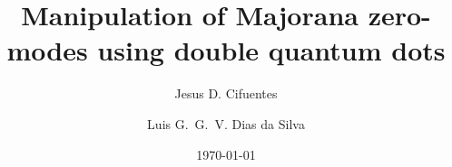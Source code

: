 \documentclass[showpacs,aps,prb,reprint,superscriptaddress]{revtex4-2}
\begin{document}
\newcommand{\be}   {\begin{equation}}
\newcommand{\ee}   {\end{equation}}
\newcommand{\ba}   {\begin{eqnarray}}
\newcommand{\ea}   {\end{eqnarray}}
\newcommand{\ve}  {\varepsilon}

\newcommand{\nhat}{\hat{n}}
\newcommand{\veck}{\textbf{k}}
\newcommand\ep{\epsilon}
\newcommand\g{\gamma}
\newcommand\s{\sigma}
\newcommand\up{\uparrow}
\newcommand\dw{\downarrow}
\newcommand\down{\downarrow}
\newcommand{\ed}[1]{\ep_{d#1}}
\newcommand{\ket}[1]{\vert #1 \rangle}
\newcommand{\ann}{a^{\dagger}}
\newcommand{\dann}{d^{\dagger}}
\newcommand{\tdots}{t_{dots}}
\newcommand{\gammaA}[1]{\gamma_{A,#1}}
\newcommand{\gammaB}[1]{\gamma_{B,#1}}
\newcommand{\Green}[1]{G_{#1}(\omega) }

\newcommand{\GreenG}[2]{G_{#1}^{ #2} (\omega) }

\newcommand{\super}{\vert \Delta \vert}





\title{ Manipulation of Majorana zero-modes using double quantum dots }

\author{Jesus D. Cifuentes}
\author{Luis G.~G.~V. Dias da Silva}

\date{ \today }
\end{document}

